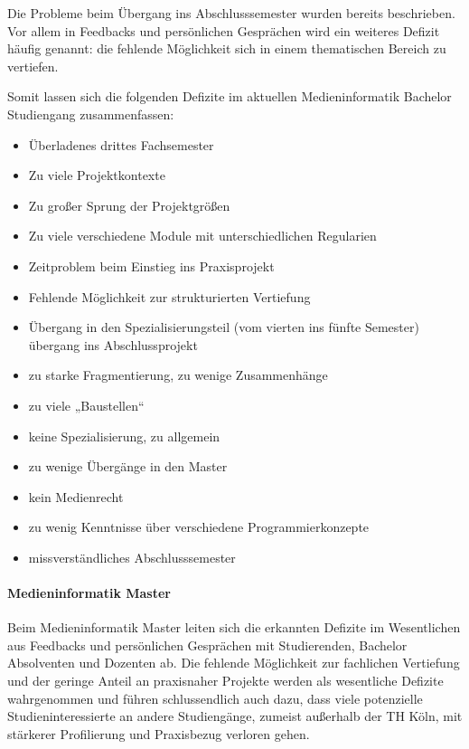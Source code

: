 Die Probleme beim Übergang ins Abschlusssemester wurden bereits
beschrieben. Vor allem in Feedbacks und persönlichen Gesprächen wird ein
weiteres Defizit häufig genannt: die fehlende Möglichkeit sich in einem
thematischen Bereich zu vertiefen.

Somit lassen sich die folgenden Defizite im aktuellen Medieninformatik
Bachelor Studiengang zusammenfassen:

\begin{itemize}
\tightlist
\item
  Überladenes drittes Fachsemester
\item
  Zu viele Projektkontexte
\item
  Zu großer Sprung der Projektgrößen
\item
  Zu viele verschiedene Module mit unterschiedlichen Regularien
\item
  Zeitproblem beim Einstieg ins Praxisprojekt
\item
  Fehlende Möglichkeit zur strukturierten Vertiefung
\item
  Übergang in den Spezialisierungsteil (vom vierten ins fünfte Semester)
  übergang ins Abschlussprojekt
\item
  zu starke Fragmentierung, zu wenige Zusammenhänge
\item
  zu viele „Baustellen``
\item
  keine Spezialisierung, zu allgemein
\item
  zu wenige Übergänge in den Master
\item
  kein Medienrecht
\item
  zu wenig Kenntnisse über verschiedene Programmierkonzepte
\item
  missverständliches Abschlusssemester
\end{itemize}

\paragraph{Medieninformatik Master}\label{medieninformatik-master}

Beim Medieninformatik Master leiten sich die erkannten Defizite im
Wesentlichen aus Feedbacks und persönlichen Gesprächen mit Studierenden,
Bachelor Absolventen und Dozenten ab. Die fehlende Möglichkeit zur
fachlichen Vertiefung und der geringe Anteil an praxisnaher Projekte
werden als wesentliche Defizite wahrgenommen und führen schlussendlich
auch dazu, dass viele potenzielle Studieninteressierte an andere
Studiengänge, zumeist außerhalb der TH Köln, mit stärkerer Profilierung
und Praxisbezug verloren gehen.


